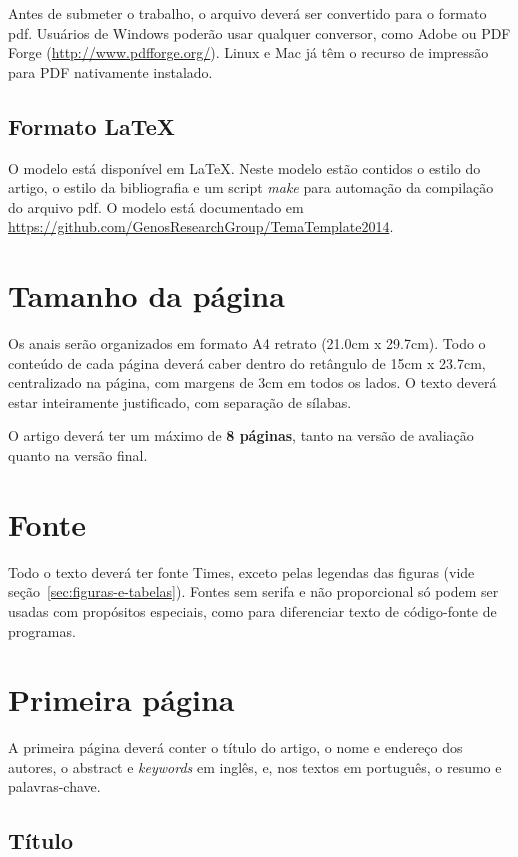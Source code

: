 \documentclass[12pt]{article}
\begin{document}
Antes de submeter o trabalho, o arquivo deverá ser convertido para o
formato pdf. Usuários de Windows poderão usar qualquer conversor, como
Adobe ou PDF Forge (\url{http://www.pdfforge.org/}). Linux e Mac já
têm o recurso de impressão para PDF nativamente instalado.

\subsection{Formato \LaTeX}
\label{sec:latex}

O modelo está disponível em \LaTeX{}. Neste modelo estão contidos o
estilo do artigo, o estilo da bibliografia e um script \textit{make}
para automação da compilação do arquivo pdf. O modelo está documentado
em \url{https://github.com/GenosResearchGroup/TemaTemplate2014}.

\section{Tamanho da página}
\label{sec:tamanho-pagina}

Os anais serão organizados em formato A4 retrato (21.0cm x 29.7cm).
Todo o conteúdo de cada página deverá caber dentro do retângulo de
15cm x 23.7cm, centralizado na página, com margens de 3cm em todos os
lados. O texto deverá estar inteiramente justificado, com separação de
sílabas.

O artigo deverá ter um máximo de \textbf{8 páginas}, tanto na versão
de avaliação quanto na versão final.

\section{Fonte}
\label{sec:fonte}

Todo o texto deverá ter fonte Times, exceto pelas legendas das figuras
(vide seção~\ref{sec:figuras-e-tabelas}). Fontes sem serifa e não
proporcional só podem ser usadas com propósitos especiais, como para
diferenciar texto de código-fonte de programas.

\section{Primeira página}

A primeira página deverá conter o título do artigo, o nome e endereço
dos autores, o abstract e \textit{keywords} em inglês, e, nos textos
em português, o resumo e palavras-chave.

\subsection{Título}
\label{sec:titulo}
\end{document}
